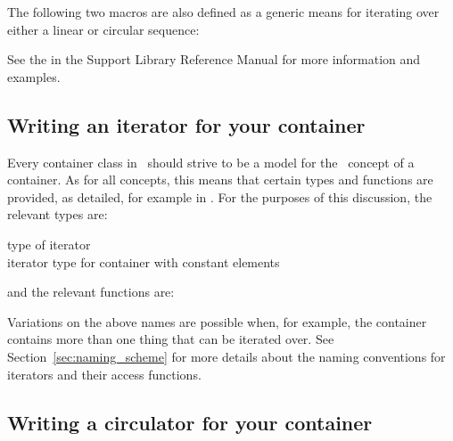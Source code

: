 The following two macros are also defined as a generic means for iterating
over either a linear or circular sequence:



See the  in the
Support Library Reference Manual for more information and examples.

\subsection{Writing an iterator for your container\label{sec:class_iterator}}

Every container class in \cgal\ should strive to be a model for the
\stl\ concept of a container.  As for all concepts, this means that 
certain types and functions are provided, as detailed, for example 
in \cite{cgal:a-gps-98}.  For the purposes of this discussion, the relevant
types are:
\begin{tabbing}
 \> type of iterator \\
 \> iterator type for container with constant elements
\end{tabbing}

and the relevant functions are:

Variations on the above names are possible when, for example, the container
contains more than one thing that can be iterated over.  See 
Section~\ref{sec:naming_scheme} for more details about the naming conventions
for iterators and their access functions.

\subsection{Writing a circulator for your container\label{sec:class_circulator}}

